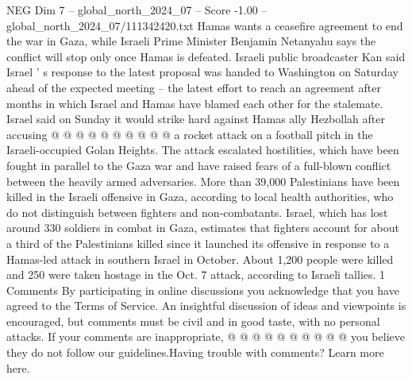 \begin{textsample}{NEG Dim 7 – global\_north\_2024\_07 – Score -1.00 – global\_north\_2024\_07/111342420.txt}
Hamas wants a ceasefire agreement to end the war in Gaza, while Israeli Prime Minister Benjamin Netanyahu says the conflict will stop only once Hamas is defeated.
Israeli public broadcaster Kan said Israel ' s response to the latest proposal was handed to Washington on Saturday ahead of the expected meeting -- the latest effort to reach an agreement after months in which Israel and Hamas have blamed each other for the stalemate.
Israel said on Sunday it would strike hard against Hamas ally Hezbollah after accusing @ @ @ @ @ @ @ @ @ @ a rocket attack on a football pitch in the Israeli-occupied Golan Heights.
The attack escalated hostilities, which have been fought in parallel to the Gaza war and have raised fears of a full-blown conflict between the heavily armed adversaries.
More than 39,000 Palestinians have been killed in the Israeli offensive in Gaza, according to local health authorities, who do not distinguish between fighters and non-combatants.
Israel, which has lost around 330 soldiers in combat in Gaza, estimates that fighters account for about a third of the Palestinians killed since it launched its offensive in response to a Hamas-led attack in southern Israel in October.
About 1,200 people were killed and 250 were taken hostage in the Oct. 7 attack, according to Israeli tallies. 1 Comments By participating in online discussions you acknowledge that you have agreed to the Terms of Service.
An insightful discussion of ideas and viewpoints is encouraged, but comments must be civil and in good taste, with no personal attacks.
If your comments are inappropriate, @ @ @ @ @ @ @ @ @ @ you believe they do not follow our guidelines.Having trouble with comments?
Learn more here.

\end{textsample}
